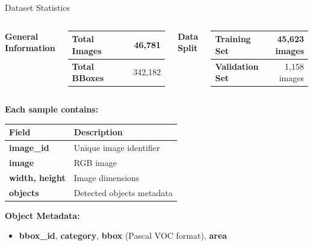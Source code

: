 \begin{frame}{Dataset Statistics}

\begin{columns}[c] %
    \centering
    \textbf{General Information}

    \vspace{0.3em}
    \begin{tabular}{|l|r|}
    \hline
    \textbf{Total Images} & 46,781 \\
    \hline
    \textbf{Total BBoxes} & 342,182 \\
    \hline
    \end{tabular}

    \centering
    \textbf{Data Split}

    \vspace{0.3em}
    \begin{tabular}{|l|r|}
    \hline
    \textbf{Training Set} & 45,623 images \\
    \hline
    \textbf{Validation Set} & 1,158 images \\
    \hline
    \end{tabular}
\end{columns}


\begin{table}[h!]
  \centering
  \textbf{Each sample contains:}
\begin{tabular}{|l|l|}
\hline
\textbf{Field} & \textbf{Description} \\
\hline
\textbf{image\_id} & Unique image identifier \\
\hline
\textbf{image} & RGB image \\
\hline
\textbf{width, height} & Image dimensions \\
\hline
\textbf{objects} & Detected objects metadata \\
\hline
\end{tabular}
\end{table}

\textbf{Object Metadata:}
\begin{itemize}
    \item \textbf{bbox\_id}, \textbf{category}, \textbf{bbox} (Pascal VOC format), \textbf{area}
\end{itemize}

\end{frame}

